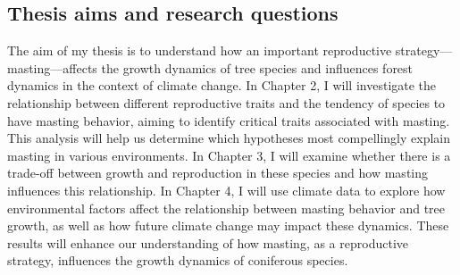 \documentclass[11pt,letter]{article}
\begin{document}
\subsection{Thesis aims and research questions} %
The aim of my thesis is to understand how an important reproductive strategy---masting---affects the growth dynamics of tree species and influences forest dynamics in the context of climate change. In Chapter 2, I will investigate the relationship between different reproductive traits and the tendency of species to have masting behavior, aiming to identify critical traits associated with masting. This analysis will help us determine which hypotheses most compellingly explain masting in various environments. In Chapter 3, I will examine whether there is a trade-off between growth and reproduction in these species and how masting influences this relationship. In Chapter 4, I will use climate data to explore how environmental factors affect the relationship between masting behavior and tree growth, as well as how future climate change may impact these dynamics. These results will enhance our understanding of how masting, as a reproductive strategy, influences the growth dynamics of coniferous species.
\end{document}
